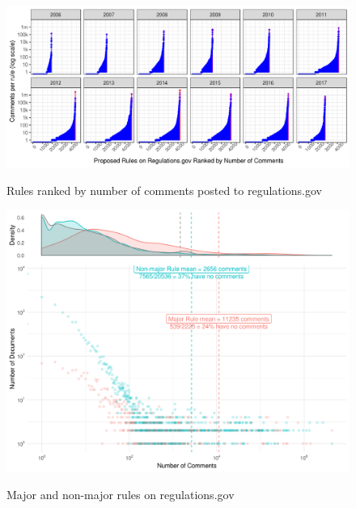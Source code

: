 \documentclass{article}
\begin{document}
\begin{figure}[h!]
    \centering
        \caption{Rules ranked by number of comments posted to regulations.gov}
    \includegraphics[width = 6.5in]{Figs/rules-ranked-comments-per-year-1.png}
    \label{fig:rules-ranked}
\end{figure}

\begin{figure}[p!]
    \centering
        \caption{Major and non-major rules on regulations.gov}
    \includegraphics[width = 7in]{Figs/major-comments-density-1.png}
    \label{fig:rules-major}
\end{figure}
\end{document}
